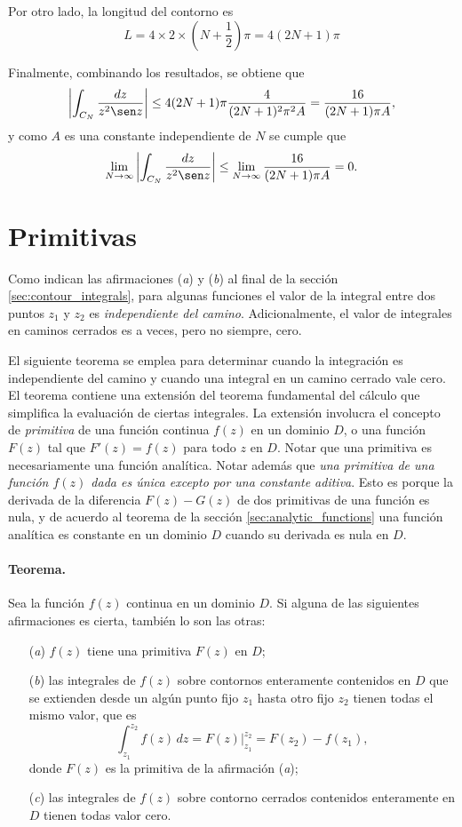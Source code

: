 \documentclass[a4paper]{report}
\begin{document}
\begin{enumerate}
 Por otro lado, la longitud del contorno es 
 \[
  L=4\times2\times\left(N+\frac{1}{2}\right)\pi=4(2N+1)\pi
 \]
 
 Finalmente, combinando los resultados, se obtiene que 
 \[
  \left|\int_{C_N}\frac{dz}{z^2\sen z}\right|\leq4(2N+1)\pi\frac{4}{(2N+1)^2\pi^2A}=\frac{16}{(2N+1)\pi A},
 \]
 y como \(A\) es una constante independiente de \(N\) se cumple que 
 \[
  \lim_{N\to\infty}\left|\int_{C_N}\frac{dz}{z^2\sen z}\right|\leq\lim_{N\to\infty}\frac{16}{(2N+1)\pi A}=0.
 \]
\end{enumerate}

\section{Primitivas}\label{sec:antiderivatives}

Como indican las afirmaciones (\textit{a}) y (\textit{b}) al final de la sección \ref{sec:contour_integrals}, para algunas funciones el valor de la integral entre dos puntos \(z_1\) y \(z_2\) es \emph{independiente del camino}. Adicionalmente, el valor de integrales en caminos cerrados es a veces, pero no siempre, cero.

El siguiente teorema se emplea para determinar cuando la integración es independiente del camino y cuando una integral en un camino cerrado vale cero. El teorema contiene una extensión del teorema fundamental del cálculo que simplifica la evaluación de ciertas integrales. La extensión involucra el concepto de \emph{primitiva} de una función continua \(f(z)\) en un dominio \(D\), o una función \(F(z)\) tal que \(F'(z)=f(z)\) para todo \(z\) en \(D\). Notar que una primitiva es necesariamente una función analítica. Notar además que \emph{una primitiva de una función \(f(z)\) dada es única excepto por una constante aditiva}. Esto es porque la derivada de la diferencia \(F(z)-G(z)\) de dos primitivas de una función es nula, y de acuerdo al teorema de la sección \ref{sec:analytic_functions} una función analítica es constante en un dominio \(D\) cuando su derivada es nula en \(D\).

\paragraph{Teorema.} Sea la función \(f(z)\) continua en un dominio \(D\). Si alguna de las siguientes afirmaciones es cierta, también lo son las otras:
\begin{enumerate}
 \item[(\textit{a})] \(f(z)\) tiene una primitiva \(F(z)\) en \(D\);
 \item[(\textit{b})] las integrales de \(f(z)\) sobre contornos enteramente contenidos en \(D\) que se extienden desde un algún punto fijo \(z_1\) hasta otro fijo \(z_2\) tienen todas el mismo valor, que es 
 \[
  \int_{z_1}^{z_2}f(z)\,dz=F(z)\bigg|_{z_1}^{z_2}=F(z_2)-f(z_1),
 \]
 donde \(F(z)\) es la primitiva de la afirmación (\textit{a});
 \item[(\textit{c})] las integrales de \(f(z)\) sobre contorno cerrados contenidos enteramente en \(D\) tienen todas valor cero.
\end{enumerate}
\end{document}
